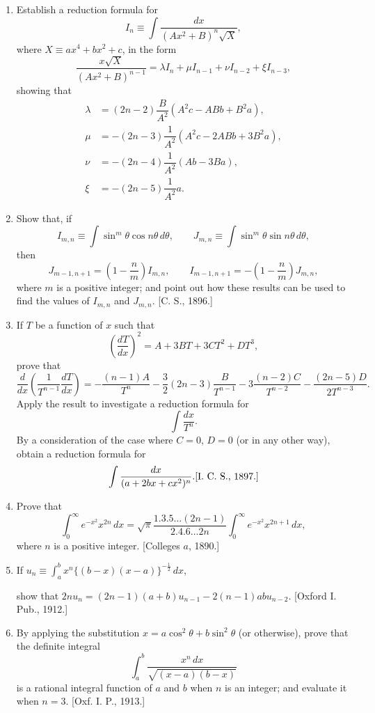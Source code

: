 \documentclass[11pt, a4paper]{article}
\newcommand{\source}[1]{\hfill\textnormal{[#1]}}
\begin{document}
\begin{enumerate}[leftmargin=2em]
\item Establish a reduction formula for
\[
I_n\equiv\int \dfrac{dx}{(Ax^2+B)^n\sqrt X},
\]
where $X\equiv ax^4+bx^2+c$, in the form
\[
\dfrac{x\sqrt X}{(Ax^2+B)^{n-1}}=\lambda I_n+\mu I_{n-1}+\nu I_{n-2}+\xi I_{n-3},
\]
showing that
\begin{align*}
\lambda&=(2n-2)\dfrac{B}{A^2}(A^2c-ABb+B^2a),\\
\mu&=-(2n-3)\dfrac{1}{A^2}(A^2c-2ABb+3B^2a),\\
\nu&=-(2n-4)\dfrac{1}{A^2}(Ab-3Ba),\\
\xi&=-(2n-5)\dfrac{1}{A^2}a.
\end{align*}

\item Show that, if
\[
I_{m,n}\equiv\int \sin^m\theta\cos n\theta\,d\theta, \qquad J_{m,n}\equiv\int \sin^m\theta\sin n\theta\,d\theta,
\]
then
\[
J_{m-1,n+1}=\left(1-\dfrac{n}{m}\right)I_{m,n}, \qquad I_{m-1,n+1}=-\left(1-\dfrac{n}{m}\right)J_{m,n},
\]
where $m$ is a positive integer; and point out how these results can be used to find the values of $I_{m,n}$ and $J_{m,n}$. \source{C. S., 1896.}

\item If $T$ be a function of $x$ such that
\[
\left(\dfrac{dT}{dx}\right)^2=A+3BT+3CT^2+DT^3,
\]
prove that
\[
\dfrac{d}{dx}\left(\dfrac{1}{T^{n-1}}\dfrac{dT}{dx}\right)=-\dfrac{(n-1)A}{T^n}-\dfrac32(2n-3)\dfrac{B}{T^{n-1}}-3\dfrac{(n-2)C}{T^{n-2}}-\dfrac{(2n-5)D}{2T^{n-3}}.
\]
Apply the result to investigate a reduction formula for
\[
\int \dfrac{dx}{T^n}.
\]
By a consideration of the case where $C=0$, $D=0$ (or in any other way), obtain a reduction formula for
\[
\int \dfrac{dx}{(a+2bx+cx^2)^n}. \source{I. C. S., 1897.}
\]

\item Prove that
\[
\int_0^\infty e^{-x^2}x^{2n}\,dx=\sqrt\pi\dfrac{1.3.5\dots(2n-1)}{2.4.6\dots2n}\int_0^\infty e^{-x^2}x^{2n+1}\,dx,
\]
where $n$ is a positive integer. \source{Colleges $a$, 1890.}

\item If $u_n\equiv\displaystyle\int_a^b x^n\{(b-x)(x-a)\}^{-\frac12}\,dx$,

show that $2nu_n=(2n-1)(a+b)u_{n-1}-2(n-1)abu_{n-2}$. \source{Oxford I. Pub., 1912.}

\item By applying the substitution $x=a\cos^2\theta+b\sin^2\theta$ (or otherwise), prove that the definite integral
\[
\int_a^b \dfrac{x^n\,dx}{\sqrt{(x-a)(b-x)}}
\]
is a rational integral function of $a$ and $b$ when $n$ is an integer; and evaluate it when $n=3$. \source{Oxf. I. P., 1913.}


\end{enumerate}
\end{document}

